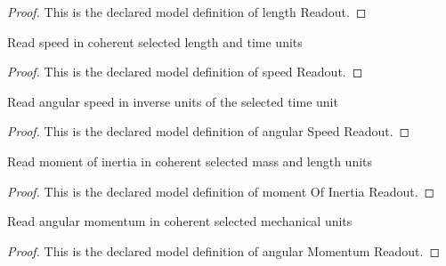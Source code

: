 \begin{proof}
  This is the declared model definition of length Readout.
\end{proof}
\begin{definition}
  \label{def:physics:phyx-mini-0827:phyxminiproblems-problemphyxmini0827-speedreadout}
  Read speed in coherent selected length and time units
\end{definition}
\begin{proof}
  This is the declared model definition of speed Readout.
\end{proof}
\begin{definition}
  \label{def:physics:phyx-mini-0827:phyxminiproblems-problemphyxmini0827-angularspeedreadout}
  Read angular speed in inverse units of the selected time unit
\end{definition}
\begin{proof}
  This is the declared model definition of angular Speed Readout.
\end{proof}
\begin{definition}
  \label{def:physics:phyx-mini-0827:phyxminiproblems-problemphyxmini0827-momentofinertiareadout}
  Read moment of inertia in coherent selected mass and length units
\end{definition}
\begin{proof}
  This is the declared model definition of moment Of Inertia Readout.
\end{proof}
\begin{definition}
  \label{def:physics:phyx-mini-0827:phyxminiproblems-problemphyxmini0827-angularmomentumreadout}
  Read angular momentum in coherent selected mechanical units
\end{definition}
\begin{proof}
  This is the declared model definition of angular Momentum Readout.
\end{proof}

